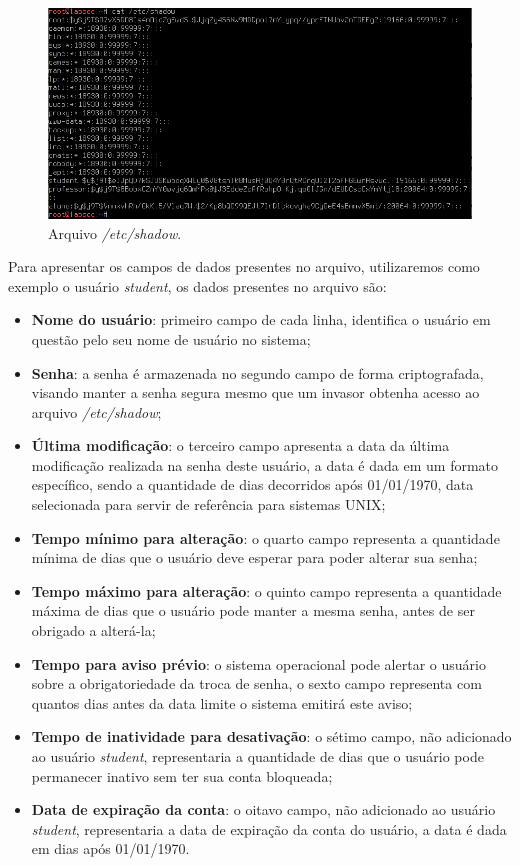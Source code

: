 \documentclass[
  12pt,				%
  oneside,   	        %
  a4paper,			%
  english,			%
  french,				%
  spanish,			%
  brazil,				%
  ]{pacotes/abntex2}
\begin{document}
\begin{figure}[H]
  \centering
  \includegraphics[scale=0.7]{figuras/shadow.png}
  \caption{Arquivo \textit{/etc/shadow}.}
  \label{fig:shadow}
\end{figure}

Para apresentar os campos de dados presentes no arquivo, utilizaremos como exemplo o usuário \textit{student}, os dados presentes no arquivo são:
\begin{itemize}
    \item \textbf{Nome do usuário}: primeiro campo de cada linha, identifica o usuário em questão pelo seu nome de usuário no sistema;
    \item \textbf{Senha}: a senha é armazenada no segundo campo de forma criptografada, visando manter a senha segura mesmo que um invasor obtenha acesso ao arquivo \textit{/etc/shadow};
    \item \textbf{Última modificação}: o terceiro campo apresenta a data da última modificação realizada na senha deste usuário, a data é dada em um formato específico, sendo a quantidade de dias decorridos após 01/01/1970, data selecionada para servir de referência para sistemas UNIX;
    \item \textbf{Tempo mínimo para alteração}: o quarto campo representa a quantidade mínima de dias que o usuário deve esperar para poder alterar sua senha;
    \item \textbf{Tempo máximo para alteração}: o quinto campo representa a quantidade máxima de dias que o usuário pode manter a mesma senha, antes de ser obrigado a alterá-la;
    \item \textbf{Tempo para aviso prévio}: o sistema operacional pode alertar o usuário sobre a obrigatoriedade da troca de senha, o sexto campo representa com quantos dias antes da data limite o sistema emitirá este aviso;
    \item \textbf{Tempo de inatividade para desativação}: o sétimo campo, não adicionado ao usuário \textit{student}, representaria a quantidade de dias que o usuário pode permanecer inativo sem ter sua conta bloqueada;
    \item \textbf{Data de expiração da conta}: o oitavo campo, não adicionado ao usuário \textit{student}, representaria a data de expiração da conta do usuário, a data é dada em dias após 01/01/1970.
\end{itemize}
\end{document}
